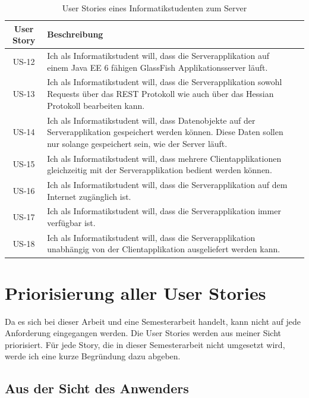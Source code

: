 \documentclass[abstracton, listof=totocnumbered,
bibliography=totocnumbered]{scrreprt}
\begin{document}
  \begin{table}[h]
    \begin{center}
      \begin{tabular}{cp{13cm}l}
        \toprule
        User Story & Beschreibung \\
        \midrule
        US-12 & Ich als Informatikstudent will, dass die Serverapplikation auf
        einem Java EE 6 fähigen GlassFish Applikationsserver läuft. \\
        US-13 & Ich als Informatikstudent will, dass die Serverapplikation sowohl
        Requests über das \ac{REST} Protokoll wie auch über das Hessian
        Protokoll bearbeiten kann. \\
        US-14 & Ich als Informatikstudent will, dass Datenobjekte auf der
        Serverapplikation gespeichert werden können. Diese Daten sollen nur solange
        gespeichert sein, wie der Server läuft. \\
        US-15 & Ich als Informatikstudent will, dass mehrere Clientapplikationen
        gleichzeitig mit der Serverapplikation bedient werden können. \\
        US-16 & Ich als Informatikstudent will, dass die Serverapplikation
        auf dem Internet zugänglich ist. \\
        US-17 & Ich als Informatikstudent will, dass die Serverapplikation immer
        verfügbar ist. \\
        US-18 & Ich als Informatikstudent will, dass die Serverapplikation
        unabhängig von der Clientapplikation ausgeliefert werden kann. \\
        \bottomrule
      \end{tabular}
      \caption{User Stories eines Informatikstudenten zum Server}
      \label{tab:serverUserStories}
    \end{center}
  \end{table}
  
  \section{Priorisierung aller User Stories}
  
  Da es sich bei dieser Arbeit und eine Semesterarbeit handelt, kann nicht auf
  jede Anforderung eingegangen werden. Die User Stories werden aus meiner Sicht
  priorisiert. Für jede Story, die in dieser Semesterarbeit nicht umgesetzt
  wird, werde ich eine kurze Begründung dazu abgeben.
  
  \subsection{Aus der Sicht des Anwenders}
  
\end{document}

